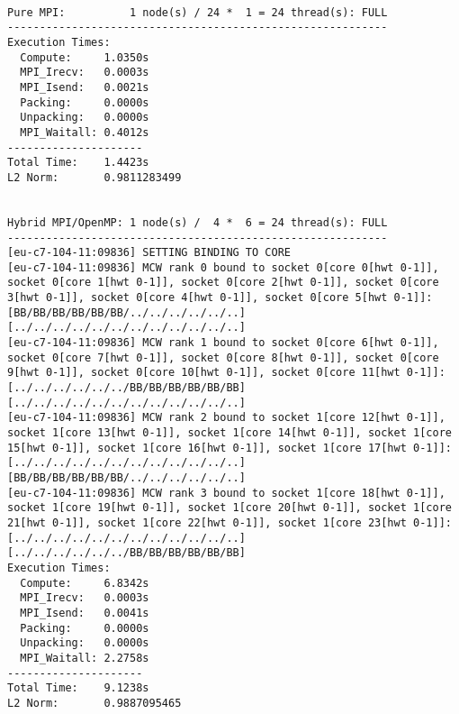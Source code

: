 \begin{lstlisting}[basicstyle=\tiny, frame=single, caption={Task 2: Collected Euler outputs.}, label={lst:1}]

Pure MPI:          1 node(s) / 24 *  1 = 24 thread(s): FULL
-----------------------------------------------------------
Execution Times:
  Compute:     1.0350s
  MPI_Irecv:   0.0003s
  MPI_Isend:   0.0021s
  Packing:     0.0000s
  Unpacking:   0.0000s
  MPI_Waitall: 0.4012s
---------------------
Total Time:    1.4423s
L2 Norm:       0.9811283499


Hybrid MPI/OpenMP: 1 node(s) /  4 *  6 = 24 thread(s): FULL 
-----------------------------------------------------------
[eu-c7-104-11:09836] SETTING BINDING TO CORE
[eu-c7-104-11:09836] MCW rank 0 bound to socket 0[core 0[hwt 0-1]], socket 0[core 1[hwt 0-1]], socket 0[core 2[hwt 0-1]], socket 0[core 3[hwt 0-1]], socket 0[core 4[hwt 0-1]], socket 0[core 5[hwt 0-1]]: [BB/BB/BB/BB/BB/BB/../../../../../..][../../../../../../../../../../../..]
[eu-c7-104-11:09836] MCW rank 1 bound to socket 0[core 6[hwt 0-1]], socket 0[core 7[hwt 0-1]], socket 0[core 8[hwt 0-1]], socket 0[core 9[hwt 0-1]], socket 0[core 10[hwt 0-1]], socket 0[core 11[hwt 0-1]]: [../../../../../../BB/BB/BB/BB/BB/BB][../../../../../../../../../../../..]
[eu-c7-104-11:09836] MCW rank 2 bound to socket 1[core 12[hwt 0-1]], socket 1[core 13[hwt 0-1]], socket 1[core 14[hwt 0-1]], socket 1[core 15[hwt 0-1]], socket 1[core 16[hwt 0-1]], socket 1[core 17[hwt 0-1]]: [../../../../../../../../../../../..][BB/BB/BB/BB/BB/BB/../../../../../..]
[eu-c7-104-11:09836] MCW rank 3 bound to socket 1[core 18[hwt 0-1]], socket 1[core 19[hwt 0-1]], socket 1[core 20[hwt 0-1]], socket 1[core 21[hwt 0-1]], socket 1[core 22[hwt 0-1]], socket 1[core 23[hwt 0-1]]: [../../../../../../../../../../../..][../../../../../../BB/BB/BB/BB/BB/BB]
Execution Times:
  Compute:     6.8342s
  MPI_Irecv:   0.0003s
  MPI_Isend:   0.0041s
  Packing:     0.0000s
  Unpacking:   0.0000s
  MPI_Waitall: 2.2758s
---------------------
Total Time:    9.1238s
L2 Norm:       0.9887095465



\end{lstlisting}
